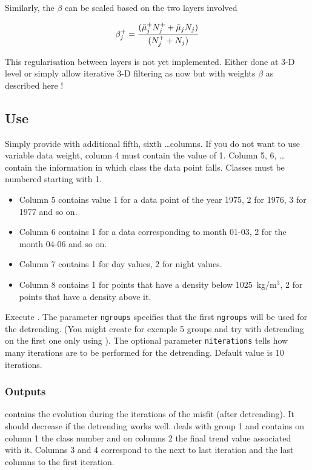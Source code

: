 Similarly, the $\beta$ can be scaled based on the two layers involved

\begin{equation}
\beta^+_j = { (\bar{\mu}^+_j N_j^+ + \bar{\mu}_j N_j) \over (N_j^++N_j) }
\end{equation}

This regularisation between layers is not yet implemented. Either done at 3-D level or simply allow iterative 3-D filtering as now but with weights $\beta$ as described here !

\subsection{Use}

Simply provide  with additional fifth, sixth \ldots columns. If you do not want to use variable data weight, column 4 must contain the value of 1. Column 5, 6, \ldots contain the information in which class the data point falls. Classes must be numbered starting with 1.

\example
\begin{itemize}
\item
Column 5 contains value 1 for a data point of the year 1975, 2 for 1976, 3 for 1977 and so on.
\item
Column 6 contains 1 for a data corresponding to month 01-03, 2 for the month 04-06 and so on.
\item
Column 7 contains 1 for day values, 2 for night values.
\item
Column 8 contains 1 for points that have a density below 1025~kg/m$^3$, 2 for points that have a density above it.
\end{itemize}

Execute . The parameter {\tt ngroups} specifies that the first {\tt ngroups} will be used for the detrending.
(You might create for exemple 5 groups and try with detrending on the first one only using ). The optional parameter {\tt niterations} tells how many iterations are to be performed for the detrending. Default value is 10 iterations.

\subsubsection{Outputs}
 contains the evolution during the iterations of the misfit (after detrending). It should decrease if the detrending works well.  
 deals with group 1 and contains on column 1 the class number and on columns 2 the final trend value associated with it. Columns 3 and 4 correspond to the next to last iteration and the last columns to the first iteration.


